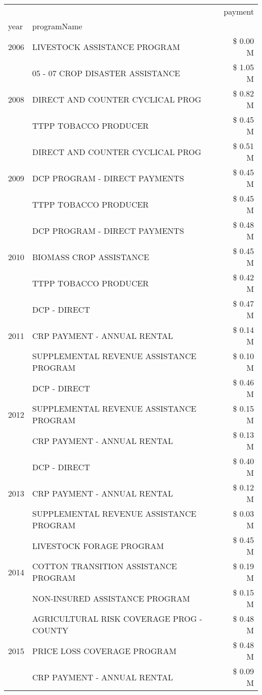 \begin{tabular}{llr}
\toprule
 &  & payment \\
year & programName &  \\
\midrule
2006 & LIVESTOCK ASSISTANCE PROGRAM & \$ 0.00 M \\
\cline{1-3}
\multirow[t]{3}{*}{2008} & 05 - 07 CROP DISASTER ASSISTANCE & \$ 1.05 M \\
 & DIRECT AND COUNTER CYCLICAL PROG & \$ 0.82 M \\
 & TTPP TOBACCO PRODUCER & \$ 0.45 M \\
\cline{1-3}
\multirow[t]{3}{*}{2009} & DIRECT AND COUNTER CYCLICAL PROG & \$ 0.51 M \\
 & DCP PROGRAM - DIRECT PAYMENTS & \$ 0.45 M \\
 & TTPP TOBACCO PRODUCER & \$ 0.45 M \\
\cline{1-3}
\multirow[t]{3}{*}{2010} & DCP PROGRAM - DIRECT PAYMENTS & \$ 0.48 M \\
 & BIOMASS CROP ASSISTANCE & \$ 0.45 M \\
 & TTPP TOBACCO PRODUCER & \$ 0.42 M \\
\cline{1-3}
\multirow[t]{3}{*}{2011} & DCP - DIRECT & \$ 0.47 M \\
 & CRP PAYMENT - ANNUAL RENTAL & \$ 0.14 M \\
 & SUPPLEMENTAL REVENUE ASSISTANCE PROGRAM & \$ 0.10 M \\
\cline{1-3}
\multirow[t]{3}{*}{2012} & DCP - DIRECT & \$ 0.46 M \\
 & SUPPLEMENTAL REVENUE ASSISTANCE PROGRAM & \$ 0.15 M \\
 & CRP PAYMENT - ANNUAL RENTAL & \$ 0.13 M \\
\cline{1-3}
\multirow[t]{3}{*}{2013} & DCP - DIRECT & \$ 0.40 M \\
 & CRP PAYMENT - ANNUAL RENTAL & \$ 0.12 M \\
 & SUPPLEMENTAL REVENUE ASSISTANCE PROGRAM & \$ 0.03 M \\
\cline{1-3}
\multirow[t]{3}{*}{2014} & LIVESTOCK FORAGE PROGRAM & \$ 0.45 M \\
 & COTTON TRANSITION ASSISTANCE PROGRAM & \$ 0.19 M \\
 & NON-INSURED ASSISTANCE PROGRAM & \$ 0.15 M \\
\cline{1-3}
\multirow[t]{3}{*}{2015} & AGRICULTURAL RISK COVERAGE PROG - COUNTY & \$ 0.48 M \\
 & PRICE LOSS COVERAGE PROGRAM & \$ 0.48 M \\
 & CRP PAYMENT - ANNUAL RENTAL & \$ 0.09 M \\

\end{tabular}
